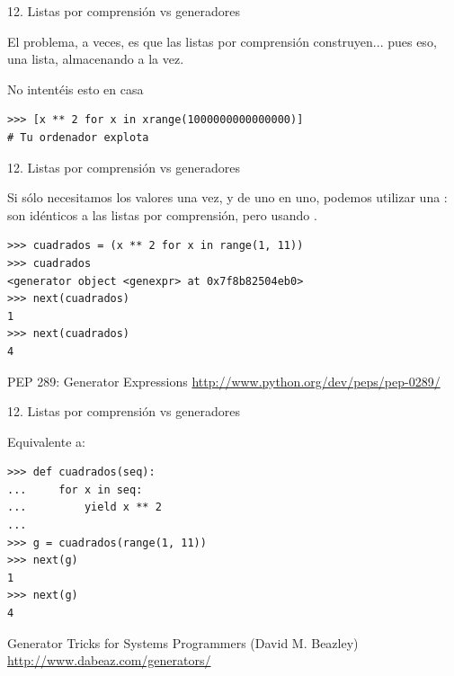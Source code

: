 \documentclass[14pt]{beamer}
\begin{document}
\begin{frame}[fragile]
  {\large 12. Listas por comprensión vs generadores}

  \begin{alertblock}{}
    \centering
    El problema, a veces, es que las listas por comprensión
    construyen... pues eso, una lista, almacenando  a la vez.
  \end{alertblock}

  \footnotesize
  \begin{exampleblock}
    {No intentéis esto en casa}
    \begin{lstlisting}
>>> [x ** 2 for x in xrange(1000000000000000)]
# Tu ordenador explota
    \end{lstlisting}
  \end{exampleblock}
\end{frame}

\begin{frame}[fragile]
  {\large 12. Listas por comprensión vs generadores}
  \small
  \begin{block}{}
    \centering
    Si sólo necesitamos los valores una vez, y de uno en uno, podemos
    utilizar una : son idénticos a las
    listas por comprensión, pero usando .
  \end{block}

  \footnotesize
  \begin{exampleblock}{}
    \begin{lstlisting}
>>> cuadrados = (x ** 2 for x in range(1, 11))
>>> cuadrados
<generator object <genexpr> at 0x7f8b82504eb0>
>>> next(cuadrados)
1
>>> next(cuadrados)
4
    \end{lstlisting}
  \end{exampleblock}

  \small
  \begin{block}
    {\centering PEP 289: Generator Expressions}
    \centering \url{http://www.python.org/dev/peps/pep-0289/}
  \end{block}
\end{frame}

\begin{frame}[fragile]
  {\large 12. Listas por comprensión vs generadores}
  \footnotesize
  \begin{exampleblock}
    {Equivalente a:}
    \begin{lstlisting}
>>> def cuadrados(seq):
...     for x in seq:
...         yield x ** 2
...
>>> g = cuadrados(range(1, 11))
>>> next(g)
1
>>> next(g)
4
    \end{lstlisting}
  \end{exampleblock}

  \small
  \begin{block}
    {\centering Generator Tricks for Systems Programmers (David M. Beazley)}
    \centering \url{http://www.dabeaz.com/generators/}
  \end{block}
\end{frame}
\end{document}
